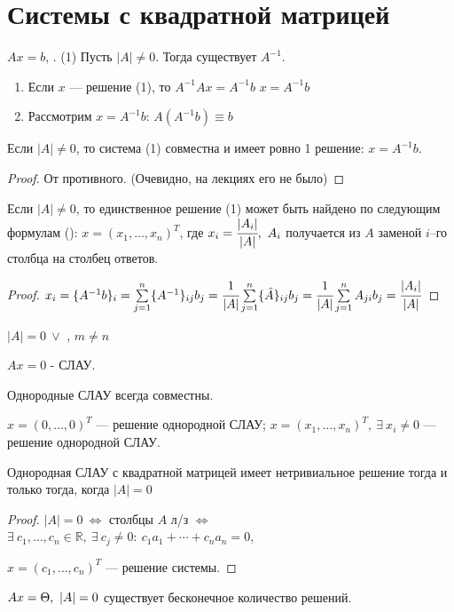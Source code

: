 \chapter{Системы с квадратной матрицей}
$Ax=b$, . (1)
Пусть $|A|\neq0$. Тогда существует $A^{-1}$.
\begin{enumerate}
\item Если $x$ --- решение (1), то $A^{-1}Ax=A^{-1}b$ \then $x=A^{-1}b$
\item Рассмотрим $x=A^{-1}b$: $A(A^{-1}b)\equiv b$
\end{enumerate}
\begin{theor}
Если $|A|\neq0$, то система (1) совместна и имеет ровно 1 решение: $x=A^{-1}b$.
\end{theor}
\begin{proof}
От противного. (Очевидно, на лекциях его не было)
\end{proof}
\begin{theor}
Если $|A|\neq0$, то единственное решение (1) может быть найдено по следующим формулам (): $x=(x_1,\ldots,x_n)^T$, где $x_i=\cfrac{|A_i|}{|A|},\ A_i$ получается из $A$ заменой $i$--го столбца на столбец ответов.
\end{theor}
\begin{proof}
$x_i=\{A^{-1}b\}_i=\sum\limits_{j=1}^n\{A^{-1}\}_{ij}b_j=\cfrac{1}{|A|}\sum\limits_{j=1}^n\{\hat{A}\}_{ij}b_j=\cfrac{1}{|A|}\sum\limits_{j=1}^nA_{ji}b_j=\cfrac{|A_i|}{|A|}$
\end{proof}
$|A|=0\ \lor$ , $m\neq n$
\begin{opred}
$Ax=0$ -  СЛАУ.
\end{opred}
Однородные СЛАУ всегда совместны.
\begin{opred}
$x=(0,\ldots,0)^T$ ---  решение однородной СЛАУ; $x=(x_1,\ldots,x_n)^T,\ \exists\ x_i\neq0$ ---  решение однородной СЛАУ.
\end{opred}
\begin{theor}
Однородная СЛАУ с квадратной матрицей имеет нетривиальное решение тогда и только тогда, когда $|A|=0$
\end{theor}
\begin{proof}
$|A|=0\ \Leftrightarrow$ столбцы $A$ л/з $\Leftrightarrow$ $\exists\ c_1,\ldots,c_n\in\mathbb{R},\ \exists\ c_j\neq0:\ c_1a_1+\cdots+c_na_n=0$,

$x=(c_1,\ldots,c_n)^T$ --- решение системы.
\end{proof}
\begin{remark}
$Ax=\Theta,\ |A|=0$ \then существует бесконечное количество решений.
\end{remark}
